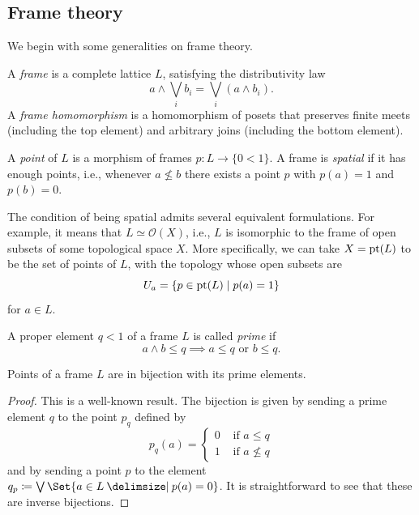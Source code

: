 \documentclass{amsart}
\begin{document}
    \subsection{Frame theory}
    We begin with some generalities on frame theory.
    \begin{Def}
        A \emph{frame} is a complete lattice $L$, satisfying the distributivity law
        \[
        a \wedge \bigvee_i b_i = \bigvee_i (a \wedge b_i).
        \]
    A \emph{frame homomorphism} is a homomorphism of posets that preserves finite meets (including the top element) and arbitrary joins (including the bottom element). 
    \end{Def}
    \begin{Def}
        A \emph{point} of $L$ is a morphism of frames $p \colon L \to \{ 0 < 1 \}$. A frame is \emph{spatial} if it has enough points, i.e., whenever $a \nleq b$ there exists a point $p$ with $p(a) = 1$ and $p(b) = 0$. 
    \end{Def}
    \begin{Rem}
        The condition of being spatial admits several equivalent formulations. For example, it means that $L \simeq \mathcal{O}(X)$, i.e., $L$ is isomorphic to the frame of open subsets of some topological space $X$. More specifically, we can take $X = \operatorname{pt}(L)$ to be the set of points of $L$, with the topology whose open subsets are 
        \[
      U_a=\{p\in\operatorname{pt}(L)\mid p(a)=1\}
    \]
    for $a \in L$. 
    \end{Rem}
    \begin{Def}
        A proper element $q<1$ of a frame $L$ is called \emph{prime} if
        \[
            a \wedge b\leq q \implies a \leq q \text{ or } b \leq q.
        \]
    \end{Def}
    \begin{Lem}\label{lem:points-prime-elements}
        Points of a frame $L$ are in bijection with its prime elements.
    \end{Lem}
    \begin{proof}
        This is a well-known result. The bijection is given by sending a prime element $q$ to the point $p_q$ defined by
        \[
        p_q(a) = \begin{cases} 
        0 & \text{ if } a \le q \\
        1 & \text{ if } a \not \le q
        \end{cases}
        \]
        and by sending a point $p$ to the element $q_p \coloneqq \bigvee \Set{a \in L \given p(a) = 0}$. It is straightforward to see that these are inverse bijections. 
        \end{proof}
\end{document}
